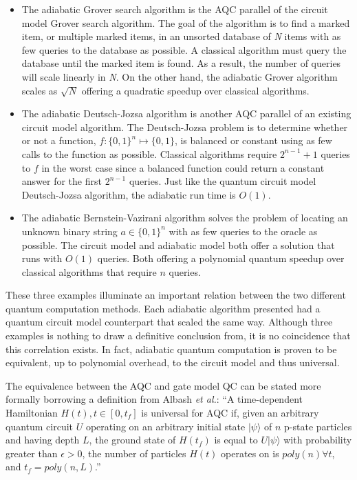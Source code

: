 \documentclass[%
 reprint,
 amsmath,amssymb,
 aps,
]{revtex4-1}
\begin{document}
   \begin{itemize}
   	\item The adiabatic Grover search algorithm is the AQC parallel of the circuit model Grover search algorithm. The goal of the algorithm is to find a marked item, or multiple marked items, in an unsorted database of \textit{N} items with as few queries to the database as possible. A classical algorithm must query the database until the marked item is found. As a result, the number of queries will scale linearly in \textit{N}. On the other hand, the adiabatic Grover algorithm scales as $\sqrt{N}$ offering a quadratic speedup over classical algorithms.
   \item The adiabatic Deutsch-Jozsa algorithm is another AQC parallel of an existing circuit model algorithm. The Deutsch-Jozsa problem is to determine whether or not a function, $f: \lbrace0,1\rbrace^n \longmapsto \lbrace0,1\rbrace$, is balanced or constant using as few calls to the function as possible. Classical algorithms require $2^{n-1} + 1$ queries to $f$ in the worst case since a balanced function could return a constant answer for the first $2^{n-1}$ queries. Just like the quantum circuit model Deutsch-Jozsa algorithm, the adiabatic run time is $O(1)$.
   \item The adiabatic Bernstein-Vazirani algorithm solves the problem of locating an unknown binary string $ a \in \lbrace0,1\rbrace^n  $ with as few queries to the oracle as possible. The circuit model and adiabatic model both offer a solution that runs with $O(1)$ queries. Both offering a polynomial quantum speedup over classical algorithms that require $n$ queries.
   \end{itemize}
   
   These three examples illuminate an important relation between the two different quantum computation methods. Each adiabatic algorithm presented had a quantum circuit model counterpart that scaled the same way. Although three examples is nothing to draw a definitive conclusion from, it is no coincidence that this correlation exists. In fact, adiabatic quantum computation is proven to be equivalent, up to polynomial overhead, to the circuit model and thus universal\cite{Aharanov2007}. 
   
   The equivalence between the AQC and gate model QC can be stated more formally borrowing a definition from Albash \textit{et al.}\cite{RevModPhys.90.015002}: ``A time-dependent Hamiltonian $H(t), t\in [0,t_{f}]$ is universal for AQC if, given an arbitrary quantum circuit $U$ operating on an arbitrary initial state $\vert\psi\rangle$ of $n$ p-state particles and having depth $L$, the ground state of $H(t_f)$ is equal to $U\vert\psi\rangle$ with probability greater than $\epsilon>0$, the number of particles $H(t)$ operates on is $poly(n) \forall t$, and $t_f = poly(n,L)$.''
\end{document}
